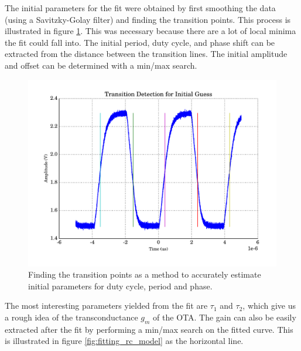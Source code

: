 The initial parameters for the  fit  were obtained by first smoothing the data
(using  a  Savitzky-Golay  filter) and finding  the  transition  points.  This
process is illustrated  in  figure  \ref{fig:transition_detection}.  This  was
necessary because there are a lot of local minima the fit could fall into. The
initial period, duty cycle, and phase shift can be extracted from the distance
between the  transition  lines.  The  initial  amplitude  and  offset  can  be
determined with a min/max search.

\begin{figure}
    \centering
    \includegraphics[width=\linewidth]{images/plots/transition-detection.pdf}
    \caption{Finding the transition points as a method to accurately estimate initial parameters for duty cycle, period and phase.}
    \label{fig:transition_detection}
\end{figure}

The  most  interesting  parameters  yielded  from  the fit  are  $\tau_1$  and
$\tau_2$, which give us a rough idea of the transconductance $g_m$ of the OTA.
The gain can also be easily extracted after  the  fit  by performing a min/max
search   on   the   fitted   curve.   This    is    illustrated    in   figure
\ref{fig:fitting_rc_model} as the horizontal line.

